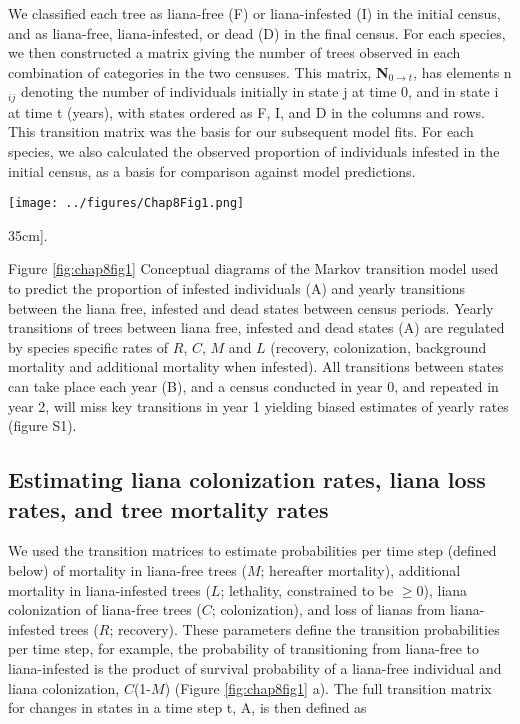 \documentclass[b5paper,justified]{tufte-book} %
\begin{document}
\begin{fullwidth}
We classified each tree as liana-free (F) or liana-infested (I) in the initial census, and as liana-free, liana-infested, or dead (D) in the final census. For each species, we then constructed a matrix giving the number of trees observed in each combination of categories in the two censuses. This matrix, \textbf{N$_{0\rightarrow t}$}, has elements n$_{ij}$ denoting the number of individuals initially in state j at time 0, and in state i at time t (years), with states ordered as F, I, and D in the columns and rows. This transition matrix was the basis for our subsequent model fits. For each species, we also calculated the observed proportion of individuals infested in the initial census, as a basis for comparison against model predictions.  


\begin{figure*}
\hspace*{1cm}\texttt{[image: ../figures/Chap8Fig1.png]}
\caption[The effects of liana infestation on expected demographic rates as a function of tree size][35cm]{.}
\label{fig:chap8fig1}
\hspace*{0.7cm} \begin{minipage}{12cm}
\vspace{0.1cm}
\footnotesize Figure \ref{fig:chap8fig1} 
Conceptual diagrams of the Markov transition model used to predict the proportion of infested individuals (A) and yearly transitions between the liana free, infested and dead states between census periods. Yearly transitions of trees between liana free, infested and dead states (A) are regulated by species specific rates of $R$, $C$, $M$ and $L$ (recovery, colonization, background mortality and additional mortality when infested).  All transitions between states can take place each year (B), and a census conducted in year 0, and repeated in year 2, will miss key transitions in year 1 yielding biased estimates of yearly rates (figure S1).
\end{minipage}
\end{figure*}


\subsection{Estimating liana colonization rates, liana loss rates, and tree mortality rates}
We used the transition matrices to estimate probabilities per time step (defined below) of mortality in liana-free trees ($M$; hereafter mortality), additional mortality in liana-infested trees ($L$; lethality, constrained to be $\geq 0$), liana colonization of liana-free trees ($C$; colonization), and loss of lianas from liana-infested trees ($R$; recovery). These parameters define the transition probabilities per time step, for example, the probability of transitioning from liana-free to liana-infested is the product of survival probability of a liana-free individual and liana colonization, $C$(1-$M$) (Figure \ref{fig:chap8fig1} a).  The full transition matrix for changes in states in a time step t, A, is then defined as 


\end{fullwidth}
\end{document}
